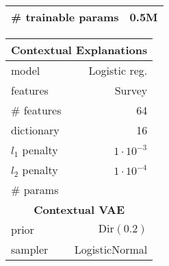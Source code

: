 \documentclass[twoside,11pt]{article}
\begin{document}
\begin{table}[t!]
\begin{subtable}[t]{.52\textwidth}
\begin{tabular}[t]{@{}c|l|r@{}}
        \midrule
        \multicolumn{2}{l}{\# trainable params}    &    0.5M            \\
        \bottomrule
    \end{tabular}\hspace{1pt}\setlength\tabcolsep{2pt}
    \begin{tabular}[t]{@{}l|r@{}}
        \toprule
        \multicolumn{2}{c}{\textbf{Contextual Explanations}}            \\
        \midrule
        model                               & Logistic reg.             \\
        features                            & Survey                    \\
        \# features                         & 64                        \\
        dictionary                          & 16                        \\
        $l_1$ penalty                       & $1 \cdot 10^{-3}$         \\
        $l_2$ penalty                       & $1 \cdot 10^{-4}$         \\
        \# params                           &                           \\
        \midrule[.75pt]
        \multicolumn{2}{c}{\textbf{Contextual VAE}}                     \\
        \midrule
        prior                               & $\mathrm{Dir}(0.2)$       \\
        sampler                             & LogisticNormal            \\
        \bottomrule
    \end{tabular}
\end{subtable}
\end{table}
\end{document}
